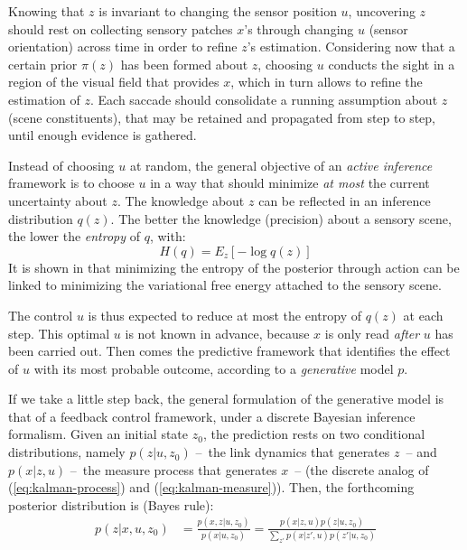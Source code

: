 \documentclass{article} %
\begin{document}
Knowing that $z$ is invariant to changing the sensor position $u$, uncovering $z$ should rest on
collecting sensory patches $x$'s through changing $u$ (sensor orientation) across time in order to refine $z$'s estimation. 
Considering now that a certain prior $\pi(z)$ has been formed about $z$, choosing  $u$ conducts the sight in a region of the visual field that provides $x$, which in turn allows to refine the estimation of $z$.
Each saccade should consolidate a running assumption about $z$ (scene constituents), that may be retained and propagated from step to step, until enough evidence is gathered.

Instead of choosing $u$ at random, the general objective of an \emph{active inference} framework is to choose $u$ in a way that should minimize \emph{at most} the current uncertainty about $z$. 
The knowledge about $z$ can be reflected in an inference distribution $q(z)$. The better the knowledge (precision) about a sensory scene, the lower the \emph{entropy} of $q$, with:
$$H(q) = E_z[- \log q(z)]$$
It is shown in \cite{friston2012perceptions} that minimizing the entropy of the posterior through action can be linked to minimizing the variational free energy attached to the sensory scene. 




The control $u$ is thus expected to reduce at most the entropy of $q(z)$ at each step. This optimal $u$ is not known in advance, because $x$ is only read \emph{after} $u$ has been carried out. Then comes the predictive framework that identifies the effect of $u$ with its most probable outcome, according to a \emph{generative} model $p$.
	
If we take a little step back, the general formulation of the generative model is that of a feedback control framework, under a discrete Bayesian inference formalism. %
Given an initial state $z_0$, the prediction rests on two conditional distributions, namely $p(z|u,z_0)$ --~the link dynamics that generates $z$~-- and $p(x|z,u)$ --~the measure process that generates $x$~--  (the discrete analog of (\ref{eq:kalman-process}) and (\ref{eq:kalman-measure})). %
Then, the forthcoming posterior distribution is (Bayes rule):
	\begin{align*}
	p(z|x,u,z_0) &= \frac{p(x,z|u,z_0)}{p(x|u,z_0)}
	= \frac{p(x|z,u) p(z|u,z_0)}{\sum_{z'}p(x|z',u) p(z'|u,z_0)}
	\end{align*}
	
\end{document}
